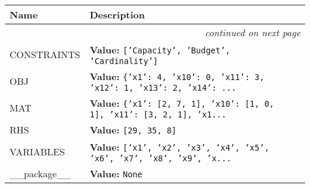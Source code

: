    \vspace{-1cm}
\hspace{\varindent}\begin{longtable}{|p{\varnamewidth}|p{\vardescrwidth}|l}
\cline{1-2}
\cline{1-2} \centering \textbf{Name} & \centering \textbf{Description}& \\
\cline{1-2}
\endhead\cline{1-2}\multicolumn{3}{r}{\small\textit{continued on next page}}\\\endfoot\cline{1-2}
\endlastfoot\raggedright C\-O\-N\-S\-T\-R\-A\-I\-N\-T\-S\- & \raggedright \textbf{Value:} 
{\tt \texttt{[}\texttt{'}\texttt{Capacity}\texttt{'}\texttt{, }\texttt{'}\texttt{Budget}\texttt{'}\texttt{, }\texttt{'}\texttt{Cardinality}\texttt{'}\texttt{]}}&\\
\cline{1-2}
\raggedright O\-B\-J\- & \raggedright \textbf{Value:} 
{\tt \texttt{\{}\texttt{'}\texttt{x1}\texttt{'}\texttt{: }4\texttt{, }\texttt{'}\texttt{x10}\texttt{'}\texttt{: }0\texttt{, }\texttt{'}\texttt{x11}\texttt{'}\texttt{: }3\texttt{, }\texttt{'}\texttt{x12}\texttt{'}\texttt{: }1\texttt{, }\texttt{'}\texttt{x13}\texttt{'}\texttt{: }2\texttt{, }\texttt{'}\texttt{x14}\texttt{'}\texttt{: }\texttt{...}}&\\
\cline{1-2}
\raggedright M\-A\-T\- & \raggedright \textbf{Value:} 
{\tt \texttt{\{}\texttt{'}\texttt{x1}\texttt{'}\texttt{: }\texttt{[}2\texttt{, }7\texttt{, }1\texttt{]}\texttt{, }\texttt{'}\texttt{x10}\texttt{'}\texttt{: }\texttt{[}1\texttt{, }0\texttt{, }1\texttt{]}\texttt{, }\texttt{'}\texttt{x11}\texttt{'}\texttt{: }\texttt{[}3\texttt{, }2\texttt{, }1\texttt{]}\texttt{, }\texttt{'}\texttt{x1}\texttt{...}}&\\
\cline{1-2}
\raggedright R\-H\-S\- & \raggedright \textbf{Value:} 
{\tt \texttt{[}29\texttt{, }35\texttt{, }8\texttt{]}}&\\
\cline{1-2}
\raggedright V\-A\-R\-I\-A\-B\-L\-E\-S\- & \raggedright \textbf{Value:} 
{\tt \texttt{[}\texttt{'}\texttt{x1}\texttt{'}\texttt{, }\texttt{'}\texttt{x2}\texttt{'}\texttt{, }\texttt{'}\texttt{x3}\texttt{'}\texttt{, }\texttt{'}\texttt{x4}\texttt{'}\texttt{, }\texttt{'}\texttt{x5}\texttt{'}\texttt{, }\texttt{'}\texttt{x6}\texttt{'}\texttt{, }\texttt{'}\texttt{x7}\texttt{'}\texttt{, }\texttt{'}\texttt{x8}\texttt{'}\texttt{, }\texttt{'}\texttt{x9}\texttt{'}\texttt{, }\texttt{'}\texttt{x}\texttt{...}}&\\
\cline{1-2}
\raggedright \_\-\_\-p\-a\-c\-k\-a\-g\-e\-\_\-\_\- & \raggedright \textbf{Value:} 
{\tt None}&\\
\cline{1-2}
\end{longtable}

